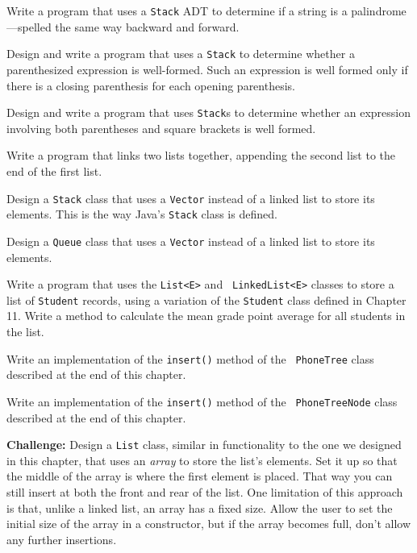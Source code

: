 \begin{EXRtwo}
\item  Write a program that uses a {\tt Stack} ADT to determine
if a string is a palindrome---spelled the same way backward and
forward.

\item  Design and write a program that uses a {\tt Stack} to determine
whether a parenthesized expression is well-formed.  Such an expression
is well formed only if there is a closing parenthesis for each opening
parenthesis.

\item  Design and write a program that uses {\tt Stack}s to determine
whether an expression involving both parentheses and square brackets
is well formed.

\item  Write a program that links two lists together, appending
the second list to the end of the first list.

\item  Design a {\tt Stack} class that uses
a {\tt Vector} instead of a linked list to store its elements.  This
is the way Java's {\tt Stack} class is defined.

\item  Design a {\tt Queue} class that uses
a {\tt Vector} instead of a linked list to store its elements.

\item Write a program that uses the {\tt List<E>} and {\tt
LinkedList<E>} classes to store a list of {\tt Student} records, using
a variation of the {\tt Student} class defined in Chapter 11. Write a
method to calculate the mean grade point average for all students in
the list.

\item Write an implementation of the {\tt insert()} method of the {\tt
PhoneTree} class described at the end of this chapter.

\item Write an implementation of the {\tt insert()} method of the {\tt
PhoneTreeNode} class described at the end of this chapter.

\item  {\bf Challenge:} Design a {\tt List} class, similar in
functionality to the one we designed in this chapter, that uses an
{\it array} to store the list's elements.  Set it up so that the middle
of the array is where the first element is placed.  That way you can still
insert at both the front and rear of the list.   One limitation of this
approach is that, unlike a linked list, an array has a fixed
size.  Allow the user to set the initial size of the array in a
constructor, but if the array becomes full, don't allow any further
insertions.


\end{EXRtwo}

